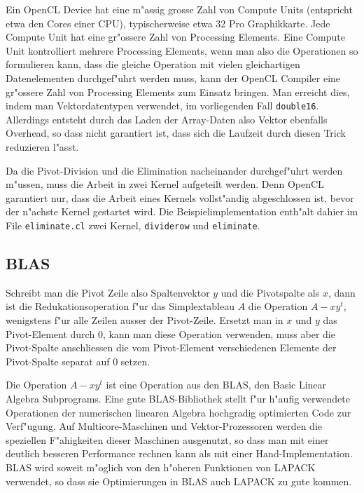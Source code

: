 Ein OpenCL Device hat eine m"assig grosse Zahl von Compute Units (entspricht
etwa den Cores einer CPU), typischerweise etwa 32 Pro Graphikkarte. Jede
Compute Unit hat eine gr"ossere Zahl von Processing Elements. Eine Compute
Unit kontrolliert mehrere Processing Elements, wenn man also die
Operationen so formulieren kann, dass die gleiche Operation mit vielen
gleichartigen Datenelementen durchgef"uhrt werden muss, kann der
OpenCL Compiler eine gr"ossere Zahl von Processing Elements zum Einsatz
bringen. Man erreicht dies, indem man Vektordatentypen verwendet, 
im vorliegenden Fall {\tt double16}. Allerdings entsteht durch das 
Laden der Array-Daten also Vektor ebenfalls Overhead, so dass nicht
garantiert ist, dass sich die Laufzeit durch diesen Trick reduzieren
l"asst.

Da die Pivot-Division und die Elimination nacheinander durchgef"uhrt
werden m"ussen, muss die Arbeit in zwei Kernel aufgeteilt werden.
Denn OpenCL garantiert nur, dass die Arbeit eines Kernels vollst"andig
abgeschlossen ist, bevor der n"achste Kernel gestartet wird.
Die Beispielimplementation enth"alt dahier im File \verb+eliminate.cl+
zwei Kernel, {\tt dividerow} und {\tt eliminate}.

\subsection{BLAS}
Schreibt man die Pivot Zeile also Spaltenvektor $y$ und
die Pivotspalte als $x$, dann ist die Redukationsoperation
f"ur das Simplextableau $A$ die Operation
$ A-xy^t $, wenigstens f"ur alle Zeilen ausser der Pivot-Zeile.
Ersetzt man in $x$ und $y$ das Pivot-Element durch $0$, kann man diese 
Operation verwenden, muss aber die Pivot-Spalte anschliessen die
vom Pivot-Element verschiedenen Elemente der Pivot-Spalte separat
auf $0$ setzen.

Die Operation $A-xy^t$ ist eine Operation aus den BLAS, den
Basic Linear Algebra Subprograms.
Eine gute BLAS-Bibliothek stellt f"ur h"aufig verwendete Operationen
der numerischen linearen Algebra hochgradig optimierten Code 
zur Verf"ugung.
Auf Multicore-Maschinen und Vektor-Prozessoren werden die speziellen
F"ahigkeiten dieser Maschinen ausgenutzt, so dass man mit einer
deutlich
besseren Performance rechnen kann als mit einer Hand-Implementation.
BLAS wird soweit m"oglich von den h"oheren Funktionen von LAPACK verwendet,
so dass sie Optimierungen in BLAS auch LAPACK zu gute kommen. 

